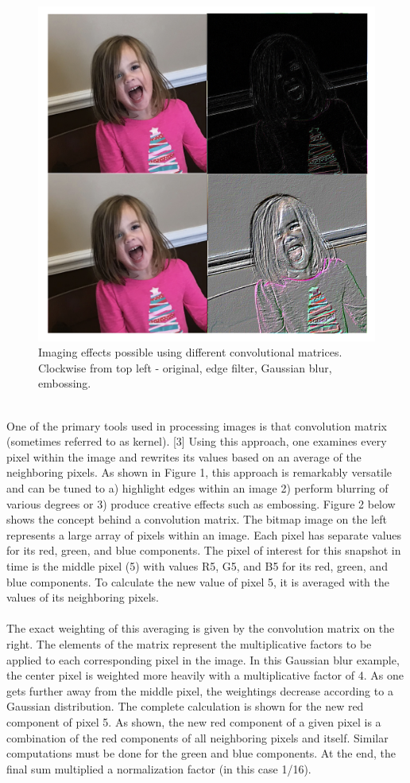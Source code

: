 \documentclass{article} %
\begin{document}
\\
\begin{figure}[ht!]
\centering
\includegraphics[width=120mm]{filters.png}
\caption{Imaging effects possible using different convolutional matrices. Clockwise from top left - original, edge filter, Gaussian blur, embossing. \label{overflow}}
\end{figure}
\\
One of the primary tools used in processing images is that convolution matrix (sometimes referred to as kernel). [3] Using this approach, one examines every pixel within the image and rewrites its values based on an average of the neighboring pixels.  As shown in Figure 1, this approach is remarkably versatile and can be tuned to a) highlight edges within an image 2) perform blurring of various degrees or 3) produce creative effects such as embossing.  Figure 2 below shows the concept behind a convolution matrix.  The bitmap image on the left represents a large array of pixels within an image. Each pixel has separate values for its red, green, and blue components. The pixel of interest for this snapshot in time is the middle pixel (5) with values R5, G5, and B5 for its red, green, and blue components.  To calculate the new value of pixel 5, it is averaged with the values of its neighboring pixels. \\
\\
The exact weighting of this averaging is given by the convolution matrix on the right. The elements of the matrix represent the multiplicative factors to be applied to each corresponding pixel in the image. In this Gaussian blur example, the center pixel is weighted more heavily with a multiplicative factor of 4. As one gets further away from the middle pixel, the weightings decrease according to a Gaussian distribution.  The complete calculation is shown for the new red component of pixel 5.  As shown, the new red component of a given pixel is a combination of the red components of all neighboring pixels and itself. Similar computations must be done for the green and blue components.  At the end, the final sum multiplied a normalization factor (in this case 1/16). \\
\end{document}
